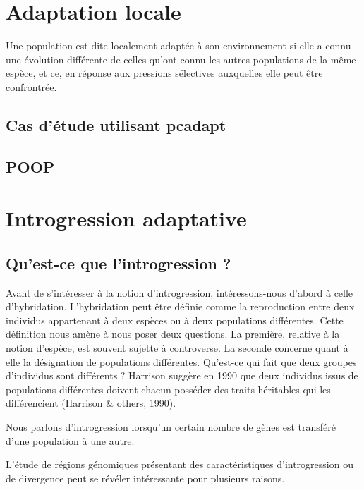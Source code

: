 \documentclass[12pt,twoside]{reedthesis}
\begin{document}
  \chapter{Adaptation locale}\label{adaptation-locale}
  
  Une population est dite localement adaptée à son environnement si elle a
  connu une évolution différente de celles qu'ont connu les autres
  populations de la même espèce, et ce, en réponse aux pressions
  sélectives auxquelles elle peut être confrontrée.
  
  \section{Cas d'étude utilisant
  pcadapt}\label{cas-detude-utilisant-pcadapt}
  
  \section{POOP}\label{poop}
  
  \chapter{Introgression adaptative}\label{introgression-adaptative}
  
  \section{Qu'est-ce que l'introgression
  ?}\label{quest-ce-que-lintrogression}
  
  Avant de s'intéresser à la notion d'introgression, intéressons-nous
  d'abord à celle d'hybridation. L'hybridation peut être définie comme la
  reproduction entre deux individus appartenant à deux espèces ou à deux
  populations différentes. Cette définition nous amène à nous poser deux
  questions. La première, relative à la notion d'espèce, est souvent
  sujette à controverse. La seconde concerne quant à elle la désignation
  de populations différentes. Qu'est-ce qui fait que deux groupes
  d'individus sont différents ? Harrison suggère en 1990 que deux
  individus issus de populations différentes doivent chacun posséder des
  traits héritables qui les différencient (Harrison \& others, 1990).
  
  Nous parlons d'introgression lorsqu'un certain nombre de gènes est
  transféré d'une population à une autre.
  
  L'étude de régions génomiques présentant des caractéristiques
  d'introgression ou de divergence peut se révéler intéressante pour
  plusieurs raisons.
  
\end{document}
